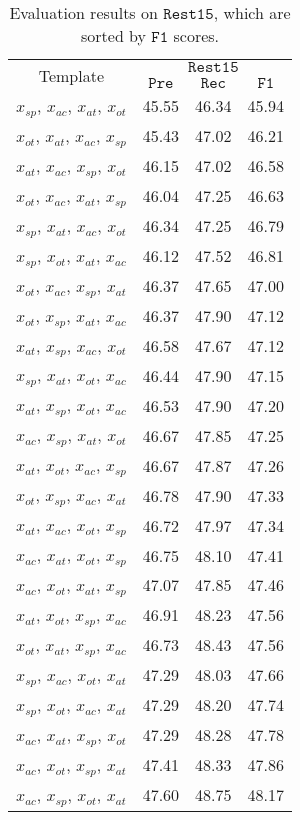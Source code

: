 \documentclass[11pt]{article}
\begin{document}
\begin{table}[]
\small
    \centering
    \begin{tabular}{c|ccc}
    \toprule
    \multirow{2}{*}{Template} & \multicolumn{3}{c}{$\mathtt{Rest15}$} \\ 
    & $\mathtt{Pre}$ & $\mathtt{Rec}$ & $\mathtt{F1}$ \\
    \midrule
$x_{sp}$, $x_{ac}$, $x_{at}$, $x_{ot}$ & 45.55 & 46.34 & 45.94 \\
$x_{ot}$, $x_{at}$, $x_{ac}$, $x_{sp}$ & 45.43 & 47.02 & 46.21 \\ 
$x_{at}$, $x_{ac}$, $x_{sp}$, $x_{ot}$ & 46.15 & 47.02 & 46.58 \\
$x_{ot}$, $x_{ac}$, $x_{at}$, $x_{sp}$ & 46.04 & 47.25 & 46.63 \\
$x_{sp}$, $x_{at}$, $x_{ac}$, $x_{ot}$ & 46.34 & 47.25 & 46.79 \\
$x_{sp}$, $x_{ot}$, $x_{at}$, $x_{ac}$ & 46.12 & 47.52 & 46.81 \\
$x_{ot}$, $x_{ac}$, $x_{sp}$, $x_{at}$ & 46.37 & 47.65 & 47.00 \\
$x_{ot}$, $x_{sp}$, $x_{at}$, $x_{ac}$ & 46.37 & 47.90 & 47.12 \\
$x_{at}$, $x_{sp}$, $x_{ac}$, $x_{ot}$ & 46.58 & 47.67 & 47.12 \\
$x_{sp}$, $x_{at}$, $x_{ot}$, $x_{ac}$ & 46.44 & 47.90 & 47.15 \\
$x_{at}$, $x_{sp}$, $x_{ot}$, $x_{ac}$ & 46.53 & 47.90 & 47.20 \\
$x_{ac}$, $x_{sp}$, $x_{at}$, $x_{ot}$ & 46.67 & 47.85 & 47.25 \\
$x_{at}$, $x_{ot}$, $x_{ac}$, $x_{sp}$ & 46.67 & 47.87 & 47.26 \\
$x_{ot}$, $x_{sp}$, $x_{ac}$, $x_{at}$ & 46.78 & 47.90 & 47.33 \\
$x_{at}$, $x_{ac}$, $x_{ot}$, $x_{sp}$ & 46.72 & 47.97 & 47.34 \\
$x_{ac}$, $x_{at}$, $x_{ot}$, $x_{sp}$ & 46.75 & 48.10 & 47.41 \\
$x_{ac}$, $x_{ot}$, $x_{at}$, $x_{sp}$ & 47.07 & 47.85 & 47.46 \\
$x_{at}$, $x_{ot}$, $x_{sp}$, $x_{ac}$ & 46.91 & 48.23 & 47.56 \\
$x_{ot}$, $x_{at}$, $x_{sp}$, $x_{ac}$ & 46.73 & 48.43 & 47.56 \\
$x_{sp}$, $x_{ac}$, $x_{ot}$, $x_{at}$ & 47.29 & 48.03 & 47.66 \\
$x_{sp}$, $x_{ot}$, $x_{ac}$, $x_{at}$ & 47.29 & 48.20 & 47.74 \\
$x_{ac}$, $x_{at}$, $x_{sp}$, $x_{ot}$ & 47.29 & 48.28 & 47.78 \\
$x_{ac}$, $x_{ot}$, $x_{sp}$, $x_{at}$ & 47.41 & 48.33 & 47.86 \\
$x_{ac}$, $x_{sp}$, $x_{ot}$, $x_{at}$ & 47.60 & 48.75 & 48.17 \\
\bottomrule
    \end{tabular}
    \caption{Evaluation results on $\mathtt{Rest15}$, which are sorted by $\mathtt{F1}$ scores.}
    \label{table:rest15_appendix_without_marker}
\end{table}
\end{document}
